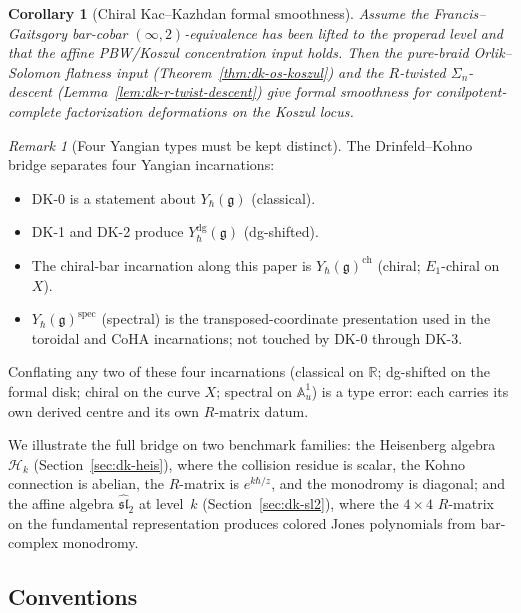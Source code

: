 \documentclass[11pt,reqno]{amsart}
\newtheorem{corollary}[theorem]{Corollary}
\theoremstyle{definition}
\theoremstyle{remark}
\newtheorem{remark}[theorem]{Remark}
\newcommand{\cH}{\mathcal{H}}
\newcommand{\fg}{\mathfrak{g}}
\numberwithin{equation}{section}
\begin{document}
\begin{corollary}[Chiral Kac--Kazhdan formal smoothness]
\label{cor:dk-chiral-kk-smooth}
Assume the Francis--Gaitsgory bar-cobar $(\infty,2)$-equivalence has
been lifted to the properad level and that the affine PBW/Koszul
concentration input holds.  Then the pure-braid Orlik--Solomon
flatness input (Theorem~\ref{thm:dk-os-koszul}) and the $R$-twisted
$\Sigma_n$-descent (Lemma~\ref{lem:dk-r-twist-descent}) give formal
smoothness for conilpotent-complete factorization deformations on the
Koszul locus.
\end{corollary}

\begin{remark}[Four Yangian types must be kept distinct]
\label{rem:four-yangian-types-dk}
The Drinfeld--Kohno bridge separates four Yangian incarnations:
\begin{itemize}
 \item DK-0 is a statement about $Y_\hbar(\fg)$ (classical).
 \item DK-1 and DK-2 produce $Y^{\mathrm{dg}}_\hbar(\fg)$ (dg-shifted).
 \item The chiral-bar incarnation along this paper is
 $Y_\hbar(\fg)^{\mathrm{ch}}$ (chiral; $E_1$-chiral on $X$).
 \item $Y_\hbar(\fg)^{\mathrm{spec}}$ (spectral) is the
 transposed-coordinate presentation used in the toroidal and CoHA
 incarnations; not touched by DK-0 through DK-3.
\end{itemize}
Conflating any two of these four incarnations (classical on
$\mathbb{R}$; dg-shifted on the formal disk; chiral on the curve $X$;
spectral on $\mathbb{A}^{1}_{u}$) is a type error: each carries its
own derived centre and its own $R$-matrix datum.
\end{remark}

We illustrate the full bridge on two benchmark families:
the Heisenberg algebra $\cH_k$ (Section~\ref{sec:dk-heis}),
where the collision residue is scalar, the Kohno connection
is abelian, the $R$-matrix is $e^{k\hbar/z}$, and the
monodromy is diagonal; and the affine algebra
$\widehat{\mathfrak{sl}}_2$ at level~$k$
(Section~\ref{sec:dk-sl2}), where the $4 \times 4$
$R$-matrix on the fundamental representation produces
colored Jones polynomials from bar-complex monodromy.

\subsection{Conventions}
\end{document}
